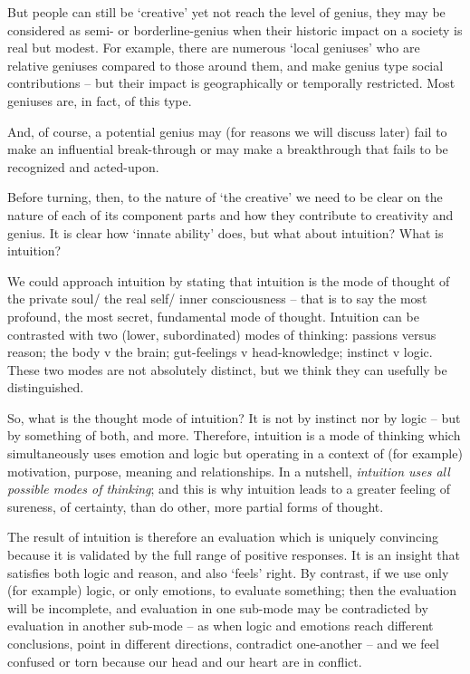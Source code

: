 \documentclass[
]{book}
\begin{document}
But people can still be `creative' yet not reach the level of genius, they may be considered as semi- or borderline-genius when their historic impact on a society is real but modest. For example, there are numerous `local geniuses' who are relative geniuses compared to those around them, and make genius type social contributions -- but their impact is geographically or temporally restricted. Most geniuses are, in fact, of this type.

And, of course, a potential genius may (for reasons we will discuss later) fail to make an influential break-through or may make a breakthrough that fails to be recognized and acted-upon.

Before turning, then, to the nature of `the creative' we need to be clear on the nature of each of its component parts and how they contribute to creativity and genius. It is clear how `innate ability' does, but what about intuition? What is intuition?

We could approach intuition by stating that intuition is the mode of thought of the private soul/ the real self/ inner consciousness -- that is to say the most profound, the most secret, fundamental mode of thought. Intuition can be contrasted with two (lower, subordinated) modes of thinking: passions versus reason; the body v the brain; gut-feelings v head-knowledge; instinct v logic. These two modes are not absolutely distinct, but we think they can usefully be distinguished.

So, what is the thought mode of intuition? It is not by instinct nor by logic -- but by something of both, and more. Therefore, intuition is a mode of thinking which simultaneously uses emotion and logic but operating in a context of (for example) motivation, purpose, meaning and relationships. In a nutshell, \emph{intuition uses all possible modes of thinking}; and this is why intuition leads to a greater feeling of sureness, of certainty, than do other, more partial forms of thought.

The result of intuition is therefore an evaluation which is uniquely convincing because it is validated by the full range of positive responses. It is an insight that satisfies both logic and reason, and also `feels' right. By contrast, if we use only (for example) logic, or only emotions, to evaluate something; then the evaluation will be incomplete, and evaluation in one sub-mode may be contradicted by evaluation in another sub-mode -- as when logic and emotions reach different conclusions, point in different directions, contradict one-another -- and we feel confused or torn because our head and our heart are in conflict.
\end{document}

